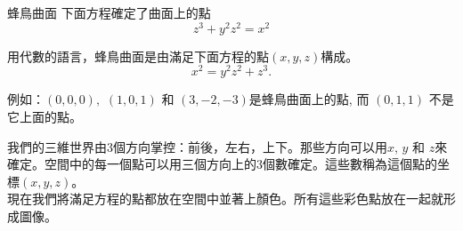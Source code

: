 \begin{surferPage}{蜂鳥曲面}
下面方程確定了曲面上的點\\
  
  \smallskip
\[z^3+ y^2	z^2	= x^2\]

\singlespacing
用代數的語言，蜂鳥曲面是由滿足下面方程的點$(x, y, z)$構成。
\smallskip
\[ x^2= y^2z^2+z^3.\]

\smallskip
例如：$(0,0,0),$ $(1,0,1)$ 和 $(3,-2,-3)$是蜂鳥曲面上的點, 而 $(0,1,1)$ 不是它上面的點。\\

\singlespacing

我們的三維世界由3個方向掌控：前後，左右，上下。那些方向可以用$x$, $y$ 和 $z$來確定。空間中的每一個點可以用三個方向上的3個數確定。這些數稱為這個點的坐標$(x,y,z)$。\\

\singlespacing
現在我們將滿足方程的點都放在空間中並著上顏色。所有這些彩色點放在一起就形成圖像。
\end{surferPage}


